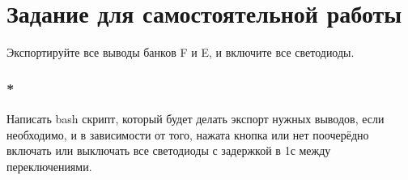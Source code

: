 \section{Задание для самостоятельной работы}
Экспортируйте все выводы банков F и E, и включите все светодиоды.

\subsubsection{*} Написать bash скрипт, который будет делать экспорт нужных выводов, если необходимо, и в зависимости от того, нажата кнопка или нет поочерёдно включать или выключать все светодиоды с задержкой в 1с между переключениями. 
